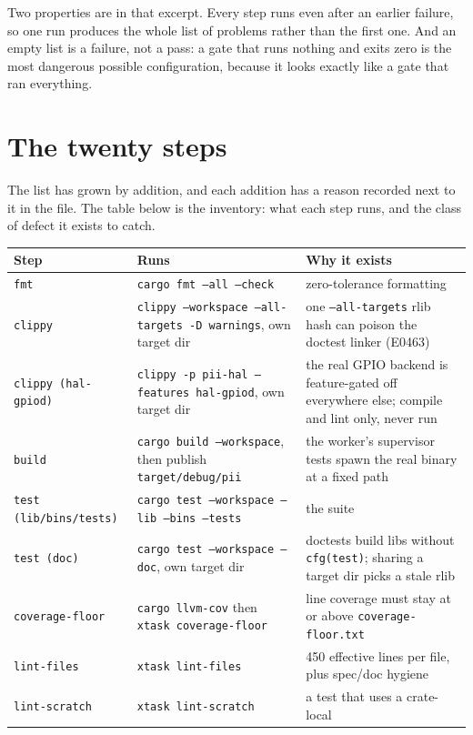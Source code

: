 Two properties are in that excerpt. Every step runs even after an earlier failure, so one run
produces the whole list of problems rather than the first one. And an empty list is a failure,
not a pass: a gate that runs nothing and exits zero is the most dangerous possible
configuration, because it looks exactly like a gate that ran everything.

\section{The twenty steps}

The list has grown by addition, and each addition has a reason recorded next to it in the
file. The table below is the inventory: what each step runs, and the class of defect it exists
to catch.

\begin{longtable}{@{}p{}p{}p{}@{}}
\toprule
\textbf{Step} & \textbf{Runs} & \textbf{Why it exists} \\
\midrule
\endhead
\texttt{fmt} & \texttt{cargo fmt --all --check} & zero-tolerance formatting \\
\texttt{clippy} & \texttt{clippy --workspace --all-targets -D warnings}, own target dir & one
\texttt{--all-targets} rlib hash can poison the doctest linker (E0463) \\
\texttt{clippy (hal-gpiod)} & \texttt{clippy -p pii-hal --features hal-gpiod}, own target dir & the
real GPIO backend is feature-gated off everywhere else; compile and lint only, never run \\
\texttt{build} & \texttt{cargo build --workspace}, then publish \texttt{target/debug/pii} & the
worker's supervisor tests spawn the real binary at a fixed path \\
\texttt{test (lib/bins/tests)} & \texttt{cargo test --workspace --lib --bins --tests} & the suite \\
\texttt{test (doc)} & \texttt{cargo test --workspace --doc}, own target dir & doctests build libs
without \texttt{cfg(test)}; sharing a target dir picks a stale rlib \\
\texttt{coverage-floor} & \texttt{cargo llvm-cov} then \texttt{xtask coverage-floor} & line coverage
must stay at or above \texttt{coverage-floor.txt} \\
\texttt{lint-files} & \texttt{xtask lint-files} & 450 effective lines per file, plus spec/doc
hygiene \\
\texttt{lint-scratch} & \texttt{xtask lint-scratch} & a test that uses a crate-local

\end{longtable}

